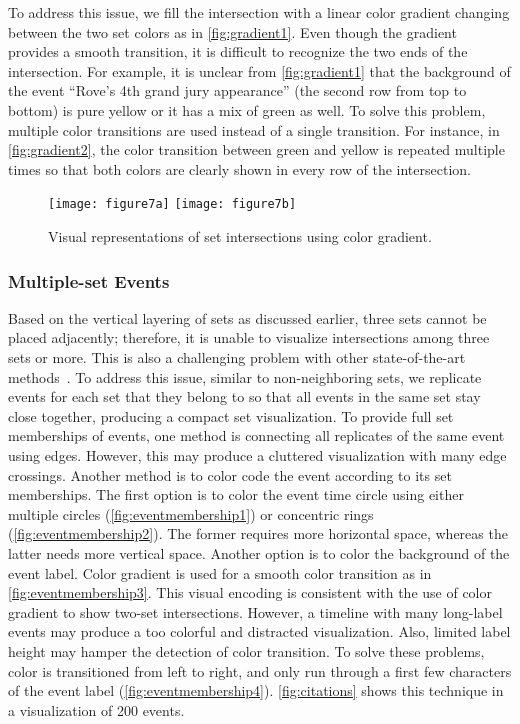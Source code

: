 To address this issue, we fill the intersection with a linear color gradient changing between the two set colors as in \autoref{fig:gradient1}. Even though the gradient provides a smooth transition, it is difficult to recognize the two ends of the intersection. For example, it is unclear from \autoref{fig:gradient1} that the background of the event ``Rove's 4th grand jury appearance'' (the second row from top to bottom) is pure yellow or it has a mix of green as well. To solve this problem, multiple color transitions are used instead of a single transition. For instance, in \autoref{fig:gradient2}, the color transition between green and yellow is repeated multiple times so that both colors are clearly shown in every row of the intersection.

\begin{figure}[!htb]
	\centering
		{\texttt{[image: figure7a]}}
	\hfill
		{\texttt{[image: figure7b]}}
	\caption{Visual representations of set intersections using color gradient.}
	\label{fig:gradient}
\end{figure}

\subsubsection{Multiple-set Events}
Based on the vertical layering of sets as discussed earlier, three sets cannot be placed adjacently; therefore, it is unable to visualize intersections among three sets or more. This is also a challenging problem with other state-of-the-art methods~\cite{Alsallakh2014}. To address this issue, similar to non-neighboring sets, we replicate events for each set that they belong to so that all events in the same set stay close together, producing a compact set visualization. To provide full set memberships of events, one method is connecting all replicates of the same event using edges. However, this may produce a cluttered visualization with many edge crossings. Another method is to color code the event according to its set memberships. The first option is to color the event time circle using either multiple circles (\autoref{fig:eventmembership1}) or concentric rings (\autoref{fig:eventmembership2}). The former requires more horizontal space, whereas the latter needs more vertical space. Another option is to color the background of the event label. Color gradient is used for a smooth color transition as in \autoref{fig:eventmembership3}. This visual encoding is consistent with the use of color gradient to show two-set intersections. However, a timeline with many long-label events may produce a too colorful and distracted visualization. Also, limited label height may hamper the detection of color transition. To solve these problems, color is transitioned from left to right, and only run through a first few characters of the event label (\autoref{fig:eventmembership4}). \autoref{fig:citations} shows this technique in a visualization of 200 events.

